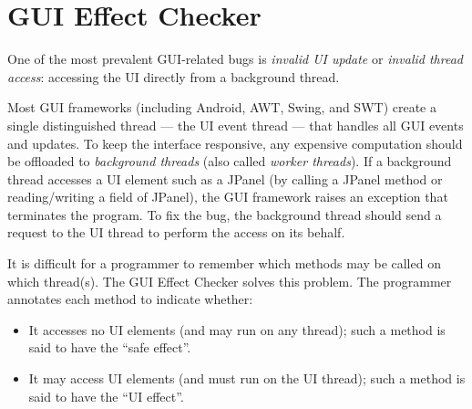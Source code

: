 \htmlhr
\chapter{GUI Effect Checker\label{guieffect-checker}}

One of the most prevalent GUI-related bugs is \emph{invalid UI update} or \emph{invalid thread access}:  accessing the UI directly from a
background thread.



Most GUI frameworks (including Android, AWT, Swing, and SWT) create
a single distinguished thread --- the UI event thread
--- that handles all GUI events and updates.
To keep the interface responsive, any expensive computation should be
offloaded to \emph{background threads} (also called \emph{worker threads}).
If a background thread accesses a UI
element such as a JPanel (by calling a JPanel method or reading/writing a
field of JPanel),
the GUI framework raises an exception that terminates the program.
To fix the bug, the background thread should send a request to the
UI thread to perform the access on its behalf.

It is difficult for a programmer to remember which methods may be called on
which thread(s).
The GUI Effect Checker solves this problem.
The programmer annotates each method to indicate whether:
\begin{itemize}
\item
  It accesses no UI elements (and may run on any thread);
  such a method is said to have the ``safe effect''.
\item
  It may access UI elements (and must run on the UI thread);
  such a method is said to have the ``UI effect''.
\end{itemize}


